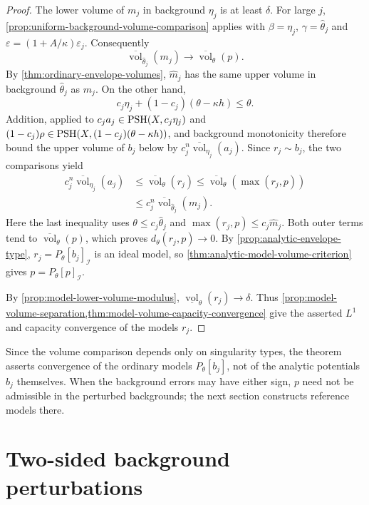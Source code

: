 \begin{proof}
The lower volume of $m_j$ in background $\eta_j$ is at least $\delta$. For large $j$, \cref{prop:uniform-background-volume-comparison} applies with $\beta=\eta_j$, $\gamma=\widehat\theta_j$ and $\varepsilon=(1+A/\kappa)\varepsilon_j$. Consequently
\[
 \overline{\operatorname{vol}}_{\widehat\theta_j}(m_j)
       \longrightarrow\overline{\operatorname{vol}}_\theta(p).
\]
By \cref{thm:ordinary-envelope-volumes}, $\widehat m_j$ has the same upper volume in background $\widehat\theta_j$ as $m_j$. On the other hand,
\[
 c_j\eta_j+(1-c_j)(\theta-\kappa h)\leq\theta.
\]
Addition, applied to $c_ja_j\in\mathrm{PSH}(X,c_j\eta_j)$ and $(1-c_j)\rho\in\mathrm{PSH}(X,(1-c_j)(\theta-\kappa h))$, and background monotonicity therefore bound the upper volume of $b_j$ below by $c_j^n\overline{\operatorname{vol}}_{\eta_j}(a_j)$. Since $r_j\sim b_j$, the two comparisons yield
\[
 \begin{split}
 c_j^n\overline{\operatorname{vol}}_{\eta_j}(a_j)
 &\leq\overline{\operatorname{vol}}_\theta(r_j)
 \leq\overline{\operatorname{vol}}_\theta(\max(r_j,p))\\
 &\leq c_j^n\overline{\operatorname{vol}}_{\widehat\theta_j}(m_j).
 \end{split}
\]
Here the last inequality uses $\theta\leq c_j\widehat\theta_j$ and $\max(r_j,p)\leq c_j\widehat m_j$. Both outer terms tend to $\overline{\operatorname{vol}}_\theta(p)$, which proves $d_\theta(r_j,p)\to0$. By \cref{prop:analytic-envelope-type}, $r_j=P_\theta[b_j]_{\mathcal I}$ is an ideal model, so \cref{thm:analytic-model-volume-criterion} gives $p=P_\theta[p]_{\mathcal I}$.

By \cref{prop:model-lower-volume-modulus}, $\underline{\operatorname{vol}}_\theta(r_j)\to\delta$. Thus \cref{prop:model-volume-separation,thm:model-volume-capacity-convergence} give the asserted $L^1$ and capacity convergence of the models $r_j$.
\end{proof}

Since the volume comparison depends only on singularity types, the theorem asserts convergence of the ordinary models $P_\theta[b_j]$, not of the analytic potentials $b_j$ themselves. When the background errors may have either sign, $p$ need not be admissible in the perturbed backgrounds; the next section constructs reference models there.

\section{Two-sided background perturbations}
\label{sec:two-sided-model-backgrounds}

